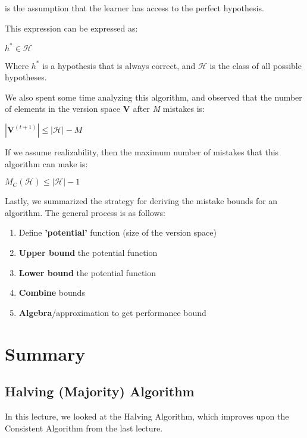 \documentclass[11pt]{article}
\begin{document}
 is the assumption that the learner has access to the perfect hypothesis.

\normalfont
This expression can be expressed as:
\begin{center}
    $h^* \in \mathcal{H}$
\end{center}

\normalfont
Where $h^*$ is a hypothesis that is always correct, and $\mathcal{H}$ is the class of all possible hypotheses. 

\normalfont
We also spent some time analyzing this algorithm, and observed that the number of elements in the version space \textbf{V} after \emph{M} mistakes is:
\begin{center}
    $|\textbf{V}^{(t+1)}| \leq |\mathcal{H}| - M$
\end{center}

\normalfont
If we assume realizability, then the maximum number of mistakes that this algorithm can make is:
\begin{center}
    $M_C(\mathcal{H}) \leq |\mathcal{H}| - 1$
\end{center}

Lastly, we summarized the strategy for deriving the mistake bounds for an algorithm. The general process is as follows:
\begin{enumerate}
    \item Define \textbf{'potential'} function (size of the version space)
    \item \textbf{Upper bound} the potential function
    \item \textbf{Lower bound} the potential function
    \item \textbf{Combine} bounds
    \item \textbf{Algebra}/approximation to get performance bound
\end{enumerate}


\section{Summary}

\subsection{Halving (Majority) Algorithm}

In this lecture, we looked at the Halving Algorithm, which improves upon the Consistent Algorithm from the last lecture. 
\end{document}
